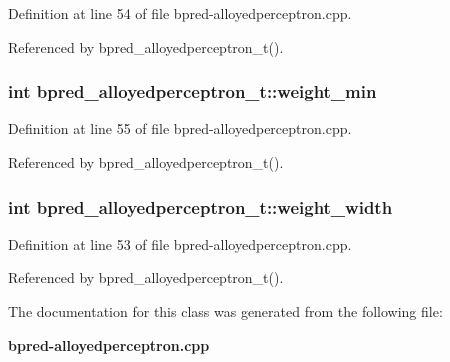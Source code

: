 Definition at line 54 of file bpred-alloyedperceptron.cpp.

Referenced by bpred\_\-alloyedperceptron\_\-t().
\subsubsection[{weight\_\-min}]{\setlength{\rightskip}{0pt plus 5cm}int {\bf bpred\_\-alloyedperceptron\_\-t::weight\_\-min}\hspace{0.3cm}{\tt  [protected]}}\label{classbpred__alloyedperceptron__t_7399978c24c6d743266519a0033be51c}




Definition at line 55 of file bpred-alloyedperceptron.cpp.

Referenced by bpred\_\-alloyedperceptron\_\-t().
\subsubsection[{weight\_\-width}]{\setlength{\rightskip}{0pt plus 5cm}int {\bf bpred\_\-alloyedperceptron\_\-t::weight\_\-width}\hspace{0.3cm}{\tt  [protected]}}\label{classbpred__alloyedperceptron__t_c55109bb5f5feccc64b254b96fe177bb}




Definition at line 53 of file bpred-alloyedperceptron.cpp.

Referenced by bpred\_\-alloyedperceptron\_\-t().

The documentation for this class was generated from the following file:\begin{CompactItemize}
\item 
{\bf bpred-alloyedperceptron.cpp}\end{CompactItemize}
